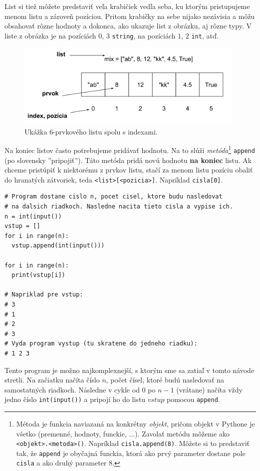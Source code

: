 \documentclass{article}
\begin{document}
List si tiež môžete predstaviť veľa krabičiek vedľa seba, ku ktorým pristupujeme menom listu a zároveň pozíciou. Pritom krabičky na sebe nijako nezávisia a môžu obsahovať rôzne hodnoty a dokonca, ako ukazuje list z obrázku, aj rôzne typy. V liste z obrázka je na pozíciách $0$, $3$ \texttt{string}, na pozíciách $1$, $2$ \texttt{int}, atď.
\begin{figure}[h]
\includegraphics[width=11cm]{list}
\centering
\caption{Ukážka 6-prvkového listu spolu s indexami.}
\end{figure}
Na koniec listov často potrebujeme pridávať hodnotu. Na to slúži \textit{metóda}\footnote{Métoda je funkcia naviazaná na konkrétny \textit{objekt}, pričom objekt v Pythone je všetko (premenné, hodnoty, funckie, ...). Zavolať metódu môžeme ako \texttt{<objekt>.<metoda>()}. Napríklad \texttt{cisla.append(8)}. Môžete si to predstaviť tak, že \texttt{append} je obyčajná funckia, ktorá ako prvý parameter dostane pole \texttt{cisla} a ako druhý parameter $8$.}  \texttt{append} (po slovensky ''pripojiť''). Táto metóda pridá novú hodnotu \textbf{na koniec} listu. Ak chceme pristúpiť k niektorému z prvkov listu, stačí za menom listu pozíciu obaliť do hranatých zátvoriek, teda \texttt{<list>[<pozicia>]}. Napríklad \texttt{cisla[0]}.
\begin{lstlisting}
# Program dostane cislo n, pocet cisel, ktore budu nasledovat
# na dalsich riadkoch. Nasledne nacita tieto cisla a vypise ich.
n = int(input())
vstup = []
for i in range(n):
  vstup.append(int(input()))

for i in range(n):
  print(vstup[i])

# Napriklad pre vstup:
# 3
# 1
# 2
# 3
# Vyda program vystup (tu skratene do jedneho riadku):
# 1 2 3
\end{lstlisting}

Tento program je možno najkomplexnejší, s ktorým sme sa zatiaľ v tomto návode stretli. Na začiatku načíta číslo $n$, počet čísel, ktoré budú nasledovať na samostatných riadkoch. Následne v cykle od $0$ po $n - 1$ (vrátane) načíta vždy jedno číslo \texttt{int(input())} a pripojí ho do listu $vstup$ pomocou \texttt{append}.
\end{document}
